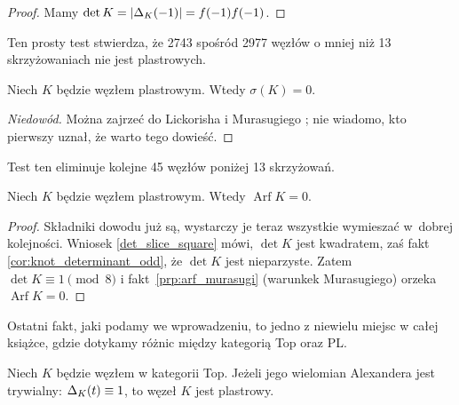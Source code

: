 \begin{proof}
    Mamy $\det K = |\Delta_K(-1)| = f(-1) f(-1)$.
\end{proof}

Ten prosty test stwierdza, że 2743 spośród 2977 węzłów o mniej niż 13 skrzyżowaniach nie jest plastrowych.

\begin{proposition}
%
    Niech $K$ będzie węzłem plastrowym.
    Wtedy $\sigma(K) = 0$.
\end{proposition}

\begin{proof}[Niedowód]
    Można zajrzeć do Lickorisha \cite[s. 90]{lickorish1997} i Murasugiego \cite[twierdzenie 8.8]{murasugi1965}; nie wiadomo, kto pierwszy uznał, że warto tego dowieść.
\end{proof}

Test ten eliminuje kolejne 45 węzłów poniżej 13 skrzyżowań.

\begin{proposition}
    Niech $K$ będzie węzłem plastrowym.
    Wtedy $\operatorname{Arf} K = 0$.
\end{proposition}

\begin{proof}
    Składniki dowodu już są, wystarczy je teraz wszystkie wymieszać w~dobrej kolejności.
    Wniosek \ref{det_slice_square} mówi, $\det K$ jest kwadratem, zaś fakt \ref{cor:knot_determinant_odd}, że $\det K$ jest nieparzyste.
    Zatem $\det K \equiv 1 \pmod 8$ i fakt~\ref{prp:arf_murasugi} (warunkek Murasugiego) orzeka $\operatorname{Arf} K = 0$.
\end{proof}


Ostatni fakt, jaki podamy we wprowadzeniu, to jedno z niewielu miejsc w całej książce, gdzie dotykamy różnic między kategorią Top oraz PL.

\begin{proposition}
\label{prp:trivial_alexander_implies_slice}%
    Niech $K$ będzie węzłem w kategorii Top.
    Jeżeli jego wielomian Alexandera jest trywialny: $\Delta_K(t) \equiv 1$, to węzeł $K$ jest plastrowy.
\end{proposition}

